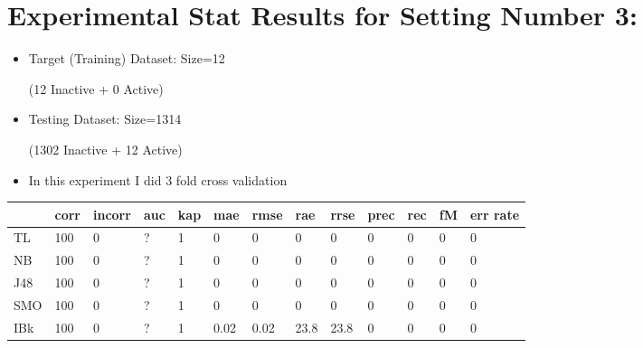 \documentclass[a4paper,12pt, english]{article}
\begin{document}
\newpage

\section{Experimental Stat Results for Setting Number 3:}
\begin{itemize}
\item Target (Training) Dataset: Size=12 \begin{scriptsize}(12 Inactive + 0 Active)\end{scriptsize}
\item Testing Dataset: Size=1314 \begin{scriptsize}(1302 Inactive + 12 Active)\end{scriptsize}
\item In this experiment I did 3 fold cross validation
\end{itemize}  
\begin{small}
\begin{center}
    \begin{tabular}{ | l | l | l | l | l | l | l | l | l | l | l | l | l |}
    \hline
      	& corr & incorr  & auc & kap & mae & rmse & rae & rrse & prec & rec & fM & err rate\\ \hline
      	TL & 100 & 0 & ? & 1 & 0 & 0 & 0 & 0 & 0 & 0 & 0 & 0\\ \hline
	NB & 100 & 0 & ? & 1 & 0 & 0 & 0 & 0 & 0 & 0 & 0 & 0\\ \hline
	J48 & 100 & 0 & ? & 1 & 0 & 0 & 0 & 0 & 0 & 0 & 0 & 0\\ \hline
	SMO & 100 & 0 & ? & 1 & 0 & 0 & 0 & 0 & 0 & 0 & 0 & 0\\ \hline
	IBk & 100 & 0 & ? & 1 & 0.02 & 0.02 & 23.8 & 23.8 & 0 & 0 & 0 & 0\\ \hline  
    \end{tabular}       
\end{center}
\end{small}
\end{document}
